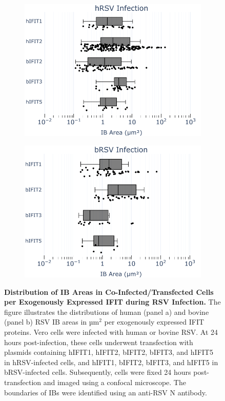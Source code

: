 \begin{figure}
    \begin{subfigure}{0.495\textwidth}
        \caption{}
        \includegraphics[width=1\linewidth]{09. Chapter 4/Figs/02. Overexpression/01. sizes-oe-hrsv.pdf} 
    \end{subfigure}
    \begin{subfigure}{0.495\textwidth}
        \caption{}
        \includegraphics[width=1\linewidth]{09. Chapter 4/Figs/02. Overexpression/02. sizes-oe-brsv.pdf}
    \end{subfigure}
    \caption[Distribution of IB Areas in Co-Infected/Transfected Cells per Exogenously Expressed IFIT during RSV Infection.]{\textbf{Distribution of IB Areas in Co-Infected/Transfected Cells per Exogenously Expressed IFIT during RSV Infection.} The figure illustrates the distributions of human (panel a) and bovine (panel b) RSV IB areas in \(\mbox{µm}^2\) per exogenously expressed IFIT proteins. Vero cells were infected with human or bovine RSV. At 24 hours post-infection, these cells underwent transfection with plasmids containing hIFIT1, hIFIT2, bIFIT2, bIFIT3, and hIFIT5 in hRSV-infected cells, and hIFIT1, bIFIT2, bIFIT3, and hIFIT5 in bRSV-infected cells. Subsequently, cells were fixed 24 hours post-transfection and imaged using a confocal microscope. The boundaries of IBs were identified using an anti-RSV N antibody.}

\end{figure}
